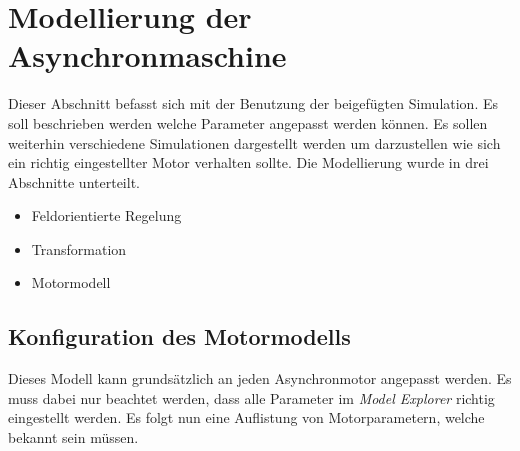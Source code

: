 \section{Modellierung der Asynchronmaschine}
Dieser Abschnitt befasst sich mit der Benutzung der beigefügten Simulation. Es soll beschrieben werden welche Parameter angepasst werden können. Es sollen weiterhin verschiedene Simulationen dargestellt werden um darzustellen wie sich ein richtig eingestellter Motor verhalten sollte.
Die Modellierung wurde in drei Abschnitte unterteilt.
\begin{itemize}
	\item Feldorientierte Regelung
	\item Transformation
	\item Motormodell
\end{itemize}
\subsection{Konfiguration des Motormodells}
Dieses Modell kann grundsätzlich an jeden Asynchronmotor angepasst werden. Es muss dabei nur beachtet werden, dass alle Parameter im \textit{Model Explorer} richtig eingestellt werden.
Es folgt nun eine Auflistung von Motorparametern, welche bekannt sein müssen.\\\par

